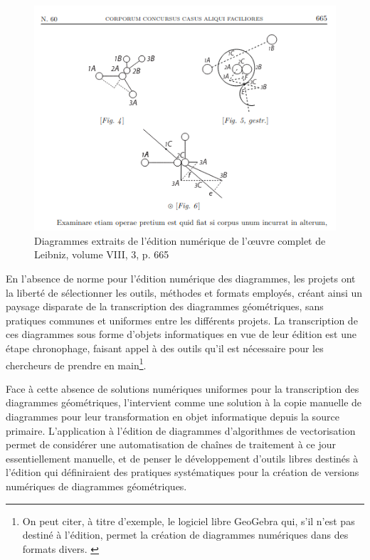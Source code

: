 	\begin{figure}[h]
		\centering
		\includegraphics[width=15cm]{images/leibniz_diag.png}
		\caption{Diagrammes extraits de l'édition numérique de l'œuvre complet de Leibniz, volume VIII, 3, p. 665}
		\label{fig:leibniz_diag}
	\end{figure}

	En l'absence de norme pour l'édition numérique des diagrammes, les projets ont la liberté de sélectionner les outils, méthodes et formats employés, créant ainsi un paysage disparate de la transcription des diagrammes géométriques, sans pratiques communes et uniformes entre les différents projets. La transcription de ces diagrammes sous forme d'objets informatiques en vue de leur édition est une étape chronophage, faisant appel à des outils qu'il est nécessaire pour les chercheurs de prendre en main\footnote{On peut citer, à titre d'exemple, le logiciel libre GeoGebra qui, s'il n'est pas destiné à l'édition, permet la création de diagrammes numériques dans des formats divers. \cite{GeoGebra}}.
	
	Face à cette absence de solutions numériques uniformes pour la transcription des diagrammes géométriques, l'\ia intervient comme une solution à la copie manuelle de diagrammes pour leur transformation en objet informatique depuis la source primaire. L'application à l'édition de diagrammes d'algorithmes de vectorisation permet de considérer une automatisation de chaînes de traitement à ce jour essentiellement manuelle, et de penser le développement d'outils libres destinés à l'édition qui définiraient des pratiques systématiques pour la création de versions numériques de diagrammes géométriques.

